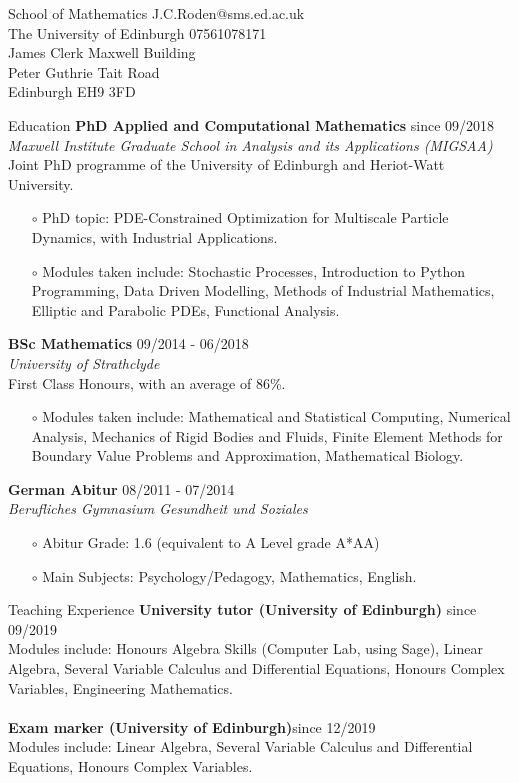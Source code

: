 \documentclass{resume} %
\begin{document}
School of Mathematics \hfill{J.C.Roden@sms.ed.ac.uk} \\
The University of Edinburgh  \hfill{07561078171}\\
James Clerk Maxwell Building\\
Peter Guthrie Tait Road\\
{Edinburgh EH9 3FD}

	
\begin{rSection}{Education}
	{\bf PhD Applied and Computational Mathematics} \hfill{since 09/2018}\\
	{\it Maxwell Institute Graduate School in Analysis and its Applications (MIGSAA)}\\
	Joint PhD programme of the University of Edinburgh and Heriot-Watt University.
	\begin{itemize}
		\item[$\circ$] PhD topic: PDE-Constrained Optimization for Multiscale Particle Dynamics, with Industrial Applications.
		\item[$\circ$]	Modules taken include: Stochastic Processes, Introduction to Python Programming, Data Driven Modelling, Methods of Industrial Mathematics, Elliptic and Parabolic PDEs, Functional Analysis.
	\end{itemize}

	
{\bf BSc Mathematics} \hfill{09/2014 - 06/2018}	\\
{\it University of Strathclyde}\\	
	First Class Honours, with an average of 86\%. 
	\begin{itemize}
		\item[$\circ$] Modules taken include: Mathematical and Statistical Computing, Numerical Analysis, Mechanics of Rigid Bodies and Fluids, Finite Element Methods for Boundary Value Problems and Approximation, Mathematical Biology.
	\end{itemize}	

{\bf German Abitur} \hfill{08/2011 - 07/2014}\\
{\it Berufliches Gymnasium Gesundheit und Soziales}	
\begin{itemize}
	\item[$\circ$] Abitur Grade: 1.6 (equivalent to A Level grade A*AA)
	\item[$\circ$] Main Subjects: Psychology/Pedagogy, Mathematics, English.
\end{itemize}	
\vspace{0.4 cm}
\end{rSection}	
\begin{rSection}{Teaching Experience}
	{\bf University tutor (University of Edinburgh)} \hfill{since 09/2019}\\
	Modules include: Honours Algebra Skills (Computer Lab, using Sage), Linear Algebra, Several Variable Calculus and Differential Equations, Honours Complex Variables, Engineering Mathematics.\\
	\\
	{\bf Exam marker (University of Edinburgh)}\hfill{since 12/2019}\\
	Modules include: Linear Algebra, Several Variable Calculus and Differential Equations, Honours Complex Variables.
\end{rSection}
\end{document}
